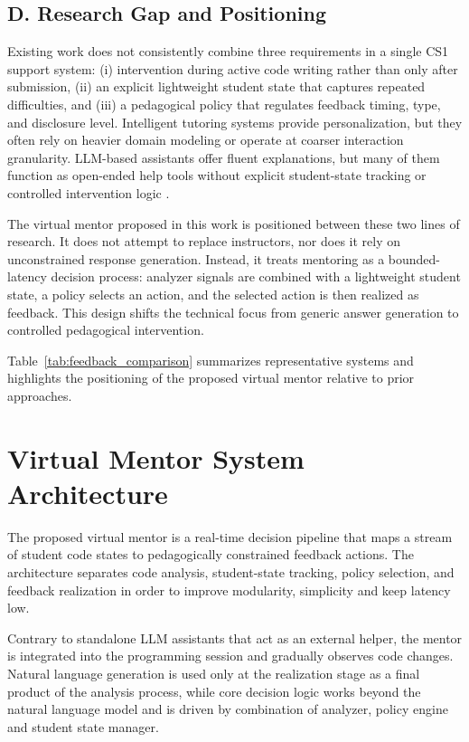 \documentclass[conference]{IEEEtran}
\begin{document}
\subsection*{D. Research Gap and Positioning}

Existing work does not consistently combine three requirements in a single CS1 support system: (i) intervention during active code writing rather than only after submission, (ii) an explicit lightweight student state that captures repeated difficulties, and (iii) a pedagogical policy that regulates feedback timing, type, and disclosure level. Intelligent tutoring systems provide personalization, but they often rely on heavier domain modeling or operate at coarser interaction granularity. LLM-based assistants offer fluent explanations, but many of them function as open-ended help tools without explicit student-state tracking or controlled intervention logic \cite{ProgTutor,NavigatingAutomatedFeedback,CodeAid,IRIS}.

The virtual mentor proposed in this work is positioned between these two lines of research. It does not attempt to replace instructors, nor does it rely on unconstrained response generation. Instead, it treats mentoring as a bounded-latency decision process: analyzer signals are combined with a lightweight student state, a policy selects an action, and the selected action is then realized as feedback. This design shifts the technical focus from generic answer generation to controlled pedagogical intervention.

Table~\ref{tab:feedback_comparison} summarizes representative systems and highlights the positioning of the proposed virtual mentor relative to prior approaches.


\section{Virtual Mentor System Architecture}

The proposed virtual mentor is a real-time decision pipeline that maps a stream of student code states to pedagogically constrained feedback actions. The architecture separates code analysis, student-state tracking, policy selection, and feedback realization in order to improve modularity, simplicity and keep latency low. 

Contrary to standalone LLM assistants that act as an external helper, the mentor is integrated into the programming session and gradually observes code changes. Natural language generation is used only at the realization stage as a final product of the analysis process, while core decision logic works beyond the natural language model and is driven by combination of analyzer, policy engine and student state manager.
\end{document}
